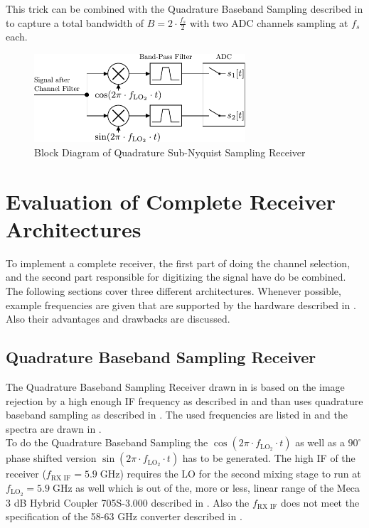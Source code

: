 This trick can be combined with the Quadrature Baseband Sampling described
in  to capture a total bandwidth of
$B = 2 \cdot \frac{f_s}{2}$ with two \gls{ADC} channels sampling at $f_s$ each. \\

\begin{figure}[p]
  \centering
  \includegraphics[width=0.7\textwidth]{figures/rx_adc_2_bd}
  \caption{Block Diagram of Quadrature Sub-Nyquist Sampling Receiver}
  \label{fig:rx_adc_2_bd}
\end{figure}

\section{Evaluation of Complete Receiver Architectures}
To implement a complete receiver, the first part of doing the channel selection,
and the second part responsible for digitizing the signal have do be combined.
The following sections cover three different architectures. Whenever possible,
example frequencies are given that are supported by the hardware described in
. Also their advantages and drawbacks are discussed. \\

\subsection{Quadrature Baseband Sampling Receiver}
\label{sec:rx_0}
The Quadrature Baseband Sampling Receiver drawn in 
is based on the image rejection by a high enough \gls{IF} frequency as
described in  and than uses quadrature baseband sampling
as described in .
The used frequencies are listed in  and the spectra are drawn
in . \\

To do the Quadrature Baseband Sampling the
$\cos(2\pi \cdot f_{\text{LO}_2} \cdot t)$ as well as a $90^\circ$
phase shifted version $\sin(2\pi \cdot f_{\text{LO}_2} \cdot t)$ has to be
generated.
The high \gls{IF} of the receiver ($f_{\text{RX IF}} = 5.9 \;\text{GHz}$)
requires the \gls{LO} for the second mixing stage to run at
$f_{\text{LO}_2} = 5.9 \;\text{GHz}$ as well which is out of the, more or less,
linear range of the Meca 3 dB Hybrid Coupler 705S-3.000 described in
. Also the $f_{\text{RX IF}}$ does not meet the
specification of the 58-63 GHz converter described in
. \\

